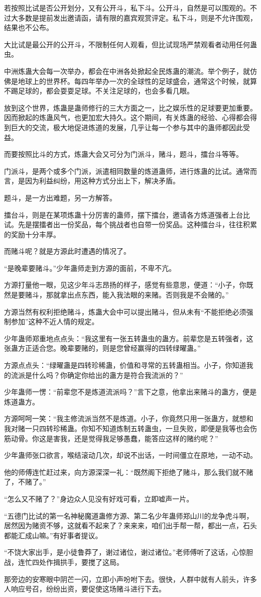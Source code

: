 \begin{this_body}
若按照比试是否公开划分，又有公开斗，私下斗。公开斗，自然是可以围观的。不过大多数是提前发出邀请函，请有限的嘉宾观赏评定。私下斗，则是不允许围观，结果也不公布。

大比试是最公开的公开斗，不限制任何人观看，但比试现场严禁观看者动用任何蛊虫。

中洲炼蛊大会每一次举办，都会在中洲各处掀起全民炼蛊的潮流。举个例子，就仿佛是地球上的世界杯。每四年举办一次的全球性的足球盛会，通常这个时候，就算不踢足球的，都会耍耍足球。不关注足球的，也会多看几眼。

放到这个世界，炼蛊是蛊师修行的三大方面之一，比之娱乐性的足球要更加重要。因而掀起的炼蛊风气，也更加宏大持久。这个期间，有关炼蛊的经验、心得都会得到巨大的交流，极大地促进炼道的发展，几乎让每一个参与其中的蛊师都因此受益。

而要按照比斗的方式，炼蛊大会又可分为门派斗，赌斗，题斗，擂台斗等等。

门派斗，是两个或多个门派，派遣相同数量的炼道蛊师，进行炼蛊的比试。通常而言，是因为利益纠纷，用这种方式分出上下，解决矛盾。

题斗，是一方出难题，另一方解答。

擂台斗，则是在某项炼蛊十分厉害的蛊师，摆下擂台，邀请各方炼道强者上台比试。先是摆擂者出一份奖品，每个挑战者也自带一份奖品。这种擂台斗，往往积累的奖励十分丰厚。

而赌斗呢？就是方源此时遭遇的情况了。

“是晚辈要赌斗。”少年蛊师走到方源的面前，不卑不亢。

方源打量他一眼，见这少年斗志昂扬的样子，感觉有些意思，便道：“小子，你既然是要赌斗，那就拿出点东西，能入我法眼的来赌。否则我是不会赌的。”

方源当然有权利拒绝赌斗，炼蛊大会中可以提出赌斗，但从未有“不能拒绝必须强制参加”这种不近人情的规定。

少年蛊师郑重地点点头：“我这里有一张五转蛊虫的蛊方。前辈您是五转强者，这张蛊方正适合您。晚辈要赌的，则是您曾经赢得的四转绿曜蛊。”

方源点点头：“绿曜蛊是四转珍稀蛊，价值和寻常的五转蛊相当。小子，你知道我的流派是什么吗？你确定你给出的蛊方是符合我流派的？”

少年蛊师一愣：“前辈您不是炼道流派吗？”言下之意，他拿出来赌斗的蛊方，便是炼道蛊方。

方源呵呵一笑：“我主修流派当然不是炼道。小子，你竟然只用一张蛊方，就想和我对赌一只四转珍稀蛊。你知不知道炼制五转蛊虫，一旦失败，即便是我等也会伤筋动骨。你这是害我，还是觉得我足够愚蠢，能答应这样的赌约呢？”

少年蛊师张口欲言，喉结滚动几次，却说不出话，一时间僵立在原地，一动不动。

他的师傅连忙赶过来，向方源深深一礼：“既然阁下拒绝了赌斗，那么我们就不赌了，不赌了。”

“怎么又不赌了？”身边众人见没有好戏可看，立即嘘声一片。

“五德门比试的第一名神秘魔道蛊修方源、第二名少年蛊师郑山川的龙争虎斗啊，居然因为赌资不够，这就看不起来了？来来来，咱们出手帮一帮，都出一点，石头都能汇成山嘛。”有好事者提议。

“不饶大家出手，是小徒鲁莽了，谢过诸位，谢过诸位。”老师傅听了这话，心惊胆战，连忙四处作揖拱手，要搅了这局。

那旁边的安寒眼中阴芒一闪，立即小声吩咐下去。很快，人群中就有人前头，许多人响应号召，纷纷出资，要促使这场赌斗进行下去。

\end{this_body}

